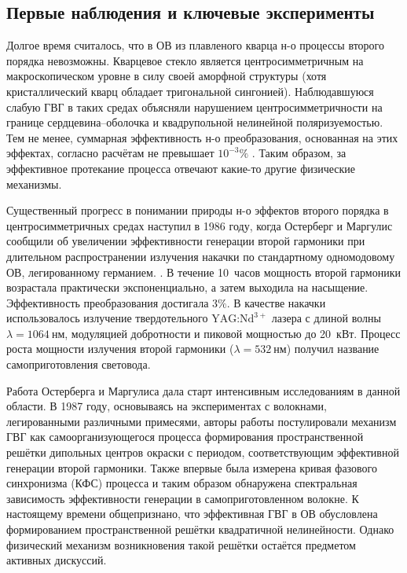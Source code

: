 \subsection{Первые наблюдения и ключевые эксперименты}\label{subsec:first_observations}

Долгое время считалось, что в ОВ из плавленого кварца н-о процессы второго порядка невозможны. Кварцевое стекло является центросимметричным на макроскопическом уровне в силу своей аморфной структуры (хотя кристаллический кварц обладает тригональной сингонией). Наблюдавшуюся слабую ГВГ в таких средах объясняли нарушением центросимметричности на границе сердцевина--оболочка и квадрупольной нелинейной поляризуемостью. Тем не менее, суммарная эффективность н-о преобразования, основанная на этих эффектах, согласно расчётам не превышает $10^{-3}\%$ \cite{terhune1987second}. Таким образом, за эффективное протекание процесса отвечают какие-то другие физические механизмы.


Существенный прогресс в понимании природы н-о эффектов второго порядка в центросимметричных средах наступил в 1986 году, когда Остерберг и Маргулис сообщили об увеличении эффективности генерации второй гармоники при длительном распространении излучения накачки по стандартному одномодовому ОВ, легированному германием. \cite{osterberg1986dye}. В течение 10~часов мощность второй гармоники возрастала практически экспоненциально, а затем выходила на насыщение. Эффективность преобразования достигала $3 \%$. В качестве накачки использовалось излучение твердотельного $\text{YAG:Nd}^{3+}$ лазера с длиной волны $\lambda = 1064~\text{нм}$, модуляцией добротности и пиковой мощностью до 20~кВт. Процесс роста мощности излучения второй гармоники ($\lambda = 532~\text{нм}$) получил название самоприготовления световода.

Работа Остерберга и Маргулиса дала старт интенсивным исследованиям в данной области. В 1987 году, основываясь на экспериментах с волокнами, легированными различными примесями, авторы работы \cite{farries1987second} постулировали механизм ГВГ как самоорганизующегося процесса формирования пространственной решётки дипольных центров окраски с периодом, соответствующим эффективной генерации второй гармоники. Также впервые была измерена кривая фазового синхронизма (КФС) процесса и таким образом обнаружена спектральная зависимость эффективности генерации в самоприготовленном волокне. К настоящему времени общепризнано, что эффективная ГВГ в ОВ обусловлена формированием пространственной решётки квадратичной нелинейности. Однако физический механизм возникновения такой решётки остаётся предметом активных дискуссий.

